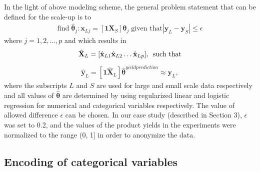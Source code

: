 \documentclass{article}
\begin{document}
In the light of above modeling scheme, the general problem statement that can be defined for the scale-up is to 
\begin{align}\label{eq:scaleup}
	\textrm{find} \; \hat{\boldsymbol{\theta}}_j\!: \mathbf{x}_{Lj} = [\mathbf{1} \mathbf{X}_S ]\boldsymbol{\theta}_j \; \textrm{given that} \left|\mathbf{y}_L - \mathbf{y}_S\right| \leq \epsilon
\end{align}                                                                  
where $j= 1,2, \ldots, p$ and which results in 
\begin{align}
	\hat{\mathbf{X}}_L = [\hat{\mathbf{x}}_{L1} \hat{\mathbf{x}}_{L2} \ldots \hat{\mathbf{x}}_{Lp}], \enskip  \textrm{such that} \nonumber
\end{align} 
\vspace{-6mm}
\begin{align}\label{eq:yieldcorresp}
	\hat{\mathbf{y}}_L = [\mathbf{1} \hat{\mathbf{X}}_L] \hat{\boldsymbol{\theta}}^{yieldprediction} \approx \mathbf{y}_L,
\end{align}                                                                                                                                                 
where the subscripts $L$ and $S$ are used for large and small scale data respectively and all values of $\hat{\boldsymbol{\theta}}$ are determined by using regularized linear and logistic regression for numerical and categorical variables respectively. The value of allowed difference $\epsilon$ can be chosen. In our case study (described in Section 3), $\epsilon$ was set to 0.2, and the values of the product yields in the experiments were normalized to the range (0, 1] in order to anonymize the data.
 
\vspace{-2mm}
\subsection{Encoding of categorical variables}
\label{ssec:encoding}
\end{document}
